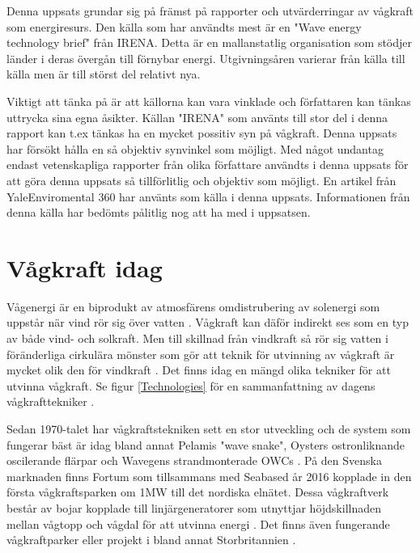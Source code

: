 \documentclass[10pt,a4paper,oneside]{article}
\begin{document}
Denna uppsats grundar sig på främst på rapporter och utvärderringar av vågkraft som energiresurs. Den källa som har användts mest är en "Wave energy technology brief" från IRENA. Detta är en mallanstatlig organisation som stödjer länder i deras övergån till förnybar energi. Utgivningsåren varierar från källa till källa men är till störst del relativt nya.

Viktigt att tänka på är att källorna kan vara vinklade och författaren kan tänkas uttrycka sina egna åsikter. Källan "IRENA" som använts till stor del i denna rapport kan t.ex tänkas ha en mycket possitiv syn på vågkraft. Denna uppsats har försökt hålla en så objektiv synvinkel som möjligt.  Med något undantag endast vetenskapliga rapporter från olika författare användts i denna uppsats för att göra denna uppsats så tillförlitlig och objektiv som möjligt. En artikel från YaleEnviromental 360 har använts som källa i denna uppsats. Informationen från denna källa har bedömts pålitlig nog att ha med i uppsatsen.\newpage



\section{Vågkraft idag}
Vågenergi är en biprodukt av atmosfärens omdistrubering av solenergi som uppstår när vind rör sig över vatten \cite{Cruz}. Vågkraft kan däför indirekt ses som en typ av både vind- och solkraft. Men till skillnad från vindkraft så rör sig vatten i föränderliga cirkulära mönster som gör att teknik för utvinning av vågkraft är mycket olik den för vindkraft \cite{Elliott}. Det finns idag en mängd olika tekniker för att utvinna vågkraft. Se figur \ref{Technologies} för en sammanfattning av dagens vågkrafttekniker \cite{IRENA}.

Sedan 1970-talet har vågkraftstekniken sett en stor utveckling och de system som fungerar bäst är idag bland annat Pelamis "wave snake", Oysters ostronliknande oscilerande flärpar och Wavegens strandmonterade  OWCs \cite{Elliott}. På den Svenska marknaden finns Fortum som tillsammans med Seabased år 2016 kopplade in den första vågkraftsparken om 1MW till det nordiska elnätet. Dessa vågkraftverk består av bojar kopplade till linjärgeneratorer som utnyttjar höjdskillnaden mellan vågtopp och vågdal för att utvinna energi \cite{Fortum}. Det finns även fungerande vågkraftparker eller projekt i bland annat Storbritannien \cite{Yale}.  
\end{document}
